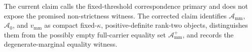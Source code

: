 The current claim calls the fixed-threshold correspondence primary and does not expose the promised non-strictness witness.  The corrected claim identifies \(\mathcal A_{\mathrm{mm}}\), \(\mathcal A_0\), and \(v_{\mathrm{mm}}\) as compact fixed-\(\kappa\), positive-definite rank-two objects, distinguishes them from the possibly empty full-carrier equality set \(\mathcal A_{\mathrm{mm}}^+\), and records the degenerate-marginal equality witness.